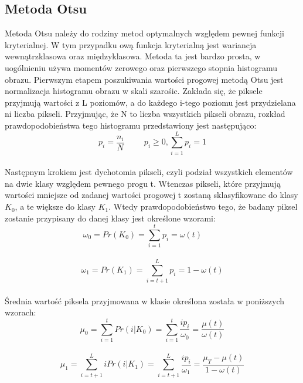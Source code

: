 \documentclass[eng,oneside]{mgr}
\begin{document}
\subsection{Metoda Otsu}
\hspace{1cm} Metoda Otsu należy do rodziny metod optymalnych względem pewnej funkcji kryterialnej. W tym przypadku ową funkcja kryterialną jest wariancja wewnątrzklasowa oraz międzyklasowa. Metoda ta jest bardzo prosta, w uogólnieniu używa momentów zerowego oraz pierwszego stopnia histogramu obrazu.
Pierwszym etapem poszukiwania wartości progowej metodą Otsu jest normalizacja histogramu obrazu w skali szarośic. Zakłada się, że piksele przyjmują wartości z L poziomów, a do każdego i-tego poziomu jest przydzielana ni liczba pikseli. Przyjmując, że N to liczba wszystkich pikseli obrazu, rozkład prawdopodobieństwa tego histogramu przedstawiony jest następująco:
\\ 
\begin{equation}
 p_i = \frac{n_i}{N} \hspace{1cm}
 p_i \geq 0, \sum_{i=1}^L p_i = 1 
\end{equation}
\\ 
\hspace{1cm} Następnym krokiem jest dychotomia pikseli, czyli podział wszystkich elementów na dwie klasy względem pewnego progu t. Wtenczas pikseli, które przyjmują wartości mniejsze od zadanej wartości progowej t zostaną sklasyfikowane do klasy $K_0$, a te większe do klasy $K_1$. Wtedy prawdopodobieństwo tego, że badany piksel zostanie przypisany do danej klasy jest określone wzorami:
\\
\begin{equation}
\omega_0 = Pr(K_0)=\sum_{i=1}^t p_i = \omega(t)\hspace{1cm}
\end{equation}
\
\begin{equation}
\omega_1 = Pr(K_1)=\sum_{i=t+1}^L p_i = 1 - \omega(t)
\end{equation}
\\
\hspace{1cm} Średnia wartość piksela przyjmowana w klasie określona została w poniższych wzorach:
\\
\begin{equation}
\mu_0=\sum_{i=1}^t Pr(i|K_0)=\sum_{i=1}^t \frac{ip_i}{\omega_0}=\frac{\mu(t)}{\omega(t)}
\end{equation}
\
\begin{equation}
\mu_1=\sum_{i=t+1}^L iPr(i|K_1)=\sum_{i=t+1}^L \frac{ip_i}{\omega_1} = \frac{\mu_T-\mu(t)}{1-\omega(t)}
\end{equation}
\end{document}
